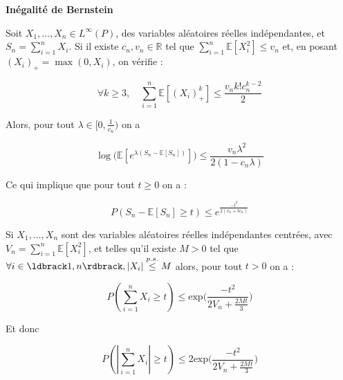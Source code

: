 \documentclass[12pt]{article}
\newcommand{\petitespace}{\vspace{0.5cm}}
\newcommand{\cercler}[1]{\tikz[baseline=(char.base)]{\node[shape=circle,draw,inner sep=1pt](char){#1};} }
\newcommand{\bb}[1]{\mathbb{#1}} %
\newcommand{\R}{\bb{R}} %
\newcommand{\somme}[2]{\sum\limits_{#1}^{#2}}
\newcommand{\Xunan}{X_1,\ldots,X_n} %
\newcommand{\esp}[1]{\bb{ E} \mathopen{}\left[#1\right]} %
\newcommand{\1}{\bb{1}} %
\begin{document}
\textbf{Inégalité de Bernstein } \petitespace

\cercler 1 Soit $\Xunan\in  L^\infty(P)$, des variables aléatoires réelles indépendantes, et $S_n = \somme{i=1}{n} X_i$. Si il existe $c_n, v_n \in \R$ tel que $\somme{i=1}{n}\esp{X_i^2} \le v_n$ et, en posant $(X_i)_+ = \max(0, X_i)$, on vérifie  :

$$\forall k \ge 3, \quad \somme{i=1}{n}\esp{(X_i)_+^k} \le \frac{v_n k! c_n^{k-2}}{2}$$

Alors, pour tout $\lambda \in [0, \frac{1}{c_n})$ on a 

$$ \log\big(\esp{e^{\lambda(S_n-\esp{S_n})}}\big) \le \frac{v_n \lambda^2}{2(1-c_n\lambda)} $$

Ce qui implique que pour tout $t \ge 0$ on a :

$$P(S_n-\esp{S_n} \ge t) \le e^{\frac{-t^2}{2(v_n+tc_n)}} $$

\cercler 2 Si $\Xunan$ sont des variables aléatoires réelles indépendantes centrées, avec $V_n = \somme{i=1}{n}\esp{X_i^2}$, et telles qu'il existe $M >0$ tel que $\forall i \in \ldbrack 1, n \rdbrack, |X_i| \overset{p.s.}{\le}M$ alors, pour tout $t > 0$ on a : 

$$P( \somme{i=1}{n}X_i  \ge t)\le \text{exp}\big(\frac{-t^2}{2V_n + \frac{2Mt}{3}}\big)$$\petitespace


Et donc 

$$ P(| \somme{i=1}{n}X_i|  \ge t)\le 2\text{exp}\big(\frac{-t^2}{2V_n + \frac{2Mt}{3}}\big)$$
\end{document}
